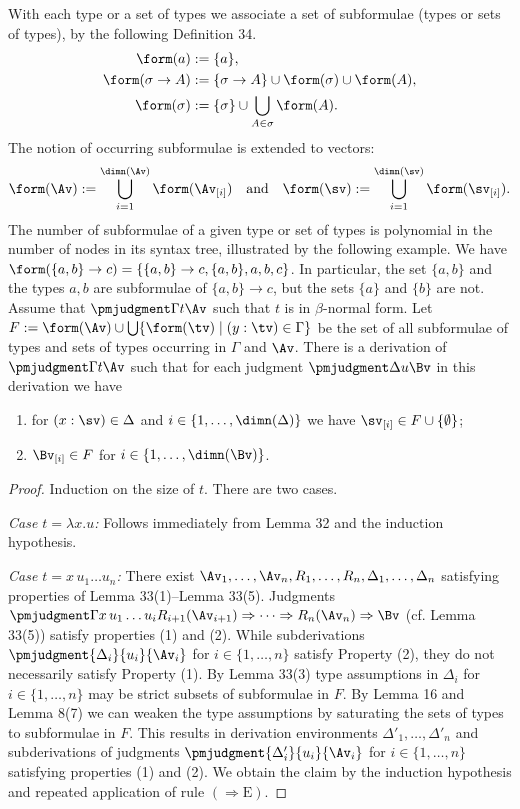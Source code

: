 With each type or a set of types we associate a set of subformulae (types or sets of types), by the following Definition 34.
\begin{align*}
\form(a)&:=\{a\},\\
\form(\sigma\to A)&:=\{\sigma\to A\}\cup\form(\sigma)\cup\form(A),\\
\form(\sigma)&:=\{\sigma\}\cup\bigcup_{A\in\sigma}\form(A).
\end{align*}
The notion of occurring subformulae is extended to vectors:
\[\form(\Av):=\bigcup_{i=1}^{\dimn(\Av)}\form(\Av_{[i]})\quad\text{and}\quad\form(\sv):=\bigcup_{i=1}^{\dimn(\sv)}\form(\sv_{[i]}).\]
The number of subformulae of a given type or set of types is polynomial in the number of nodes in its syntax tree, illustrated by the following example.
 We have $\form(\{a,b\}\to c)=\{\{a,b\}\to c,\{a,b\},a,b,c\}$. In particular, the set $\{a,b\}$ and the types $a,b$ are subformulae of $\{a,b\}\to c$, but the sets $\{a\}$ and $\{b\}$ are not.
Assume that $\pmjudgment\Gamma t\Av$ such that $t$ is in $\beta$-normal form. Let $F:=\form(\Av)\cup\bigcup\{\form(\tv)\mid(y:\tv)\in\Gamma\}$ be the set of all subformulae of types and sets of types occurring in $\Gamma$ and $\Av$. There is a derivation of $\pmjudgment\Gamma t\Av$ such that for each judgment $\pmjudgment\Delta u\Bv$ in this derivation we have
\begin{enumerate}
\item for $(x:\sv)\in\Delta$ and $i\in\{1,\ldots,\dimn(\Delta)\}$ we have $\sv_{[i]}\in F\cup\{\emptyset\}$;
\item $\Bv_{[i]}\in F$ for $i\in\{1,\ldots,\dimn(\Bv)\}$.
\end{enumerate}
\begin{proof}
Induction on the size of $t$. There are two cases.\par
\emph{Case $t=\lambda x.u$:} Follows immediately from Lemma 32 and the induction hypothesis.\par
\emph{Case $t=x\,u_1\ldots u_n$:} There exist $\Av_1,\ldots,\Av_n,R_1,\ldots,R_n,\Delta_1,\ldots,\Delta_n$ satisfying properties of Lemma 33(1)--Lemma 33(5). Judgments $\pmjudgment\Gamma{x\,u_1\ldots u_i}{R_{i+1}(\Av_{i+1})\Rightarrow\cdots\Rightarrow R_n(\Av_n)\Rightarrow\Bv}$ (cf. Lemma 33(5)) satisfy properties (1) and (2). While subderivations $\pmjudgment{\Delta_i}{u_i}{\Av_i}$ for $i\in\{1,\ldots,n\}$ satisfy Property (2), they do not necessarily satisfy Property (1). By Lemma 33(3) type assumptions in $\Delta_i$ for $i\in\{1,\ldots,n\}$ may be strict subsets of subformulae in $F$. By Lemma 16 and Lemma 8(7) we can weaken the type assumptions by saturating the sets of types to subformulae in $F$. This results in derivation environments $\Delta'_1,\ldots,\Delta'_n$ and subderivations of judgments $\pmjudgment{\Delta'_i}{u_i}{\Av_i}$ for $i\in\{1,\ldots,n\}$ satisfying properties (1) and (2). We obtain the claim by the induction hypothesis and repeated application of rule $(\Rightarrow\mathrm E)$.
\end{proof}
